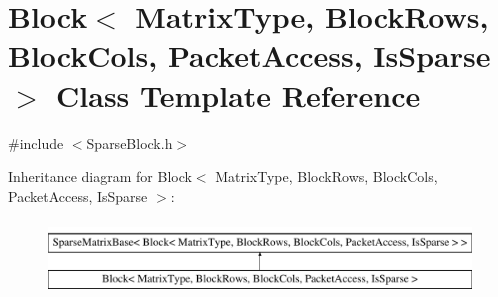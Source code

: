 \hypertarget{class_block_3_01_matrix_type_00_01_block_rows_00_01_block_cols_00_01_packet_access_00_01_is_sparse_01_4}{\section{Block$<$ Matrix\-Type, Block\-Rows, Block\-Cols, Packet\-Access, Is\-Sparse $>$ Class Template Reference}
\label{class_block_3_01_matrix_type_00_01_block_rows_00_01_block_cols_00_01_packet_access_00_01_is_sparse_01_4}
}


{\ttfamily \#include $<$Sparse\-Block.\-h$>$}

Inheritance diagram for Block$<$ Matrix\-Type, Block\-Rows, Block\-Cols, Packet\-Access, Is\-Sparse $>$\-:\begin{figure}[H]
\begin{center}
\leavevmode
\includegraphics[height=2.000000cm]{class_block_3_01_matrix_type_00_01_block_rows_00_01_block_cols_00_01_packet_access_00_01_is_sparse_01_4}
\end{center}
\end{figure}
